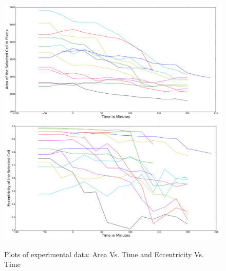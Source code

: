 \documentclass[twocolumn,notitlepage]{revtex4-1}
\begin{document}
\begin{center}
\begin{figure}
\includegraphics[width=.95\textwidth]{img/mplAreaVsTime.pdf}
\includegraphics[width=.95\textwidth]{img/mplEccentricityVsTime.pdf}
\caption{\label{fig:resultPlots}Plots of experimental data: Area Vs. Time and Eccentricity Vs. Time}
\end{figure}
\end{center}


\end{document}

